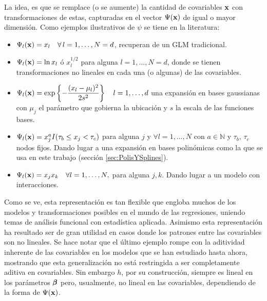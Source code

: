 \documentclass[../Main/Main.tex]{subfiles}
\begin{document}
La idea, es que se remplace (o se aumente) la cantidad de covariables $\mathbf{x}$ con transformaciones de estas, capturadas en el vector $\Psi(\mathbf{x})$ de igual o mayor dimensión. Como ejemplos ilustrativos de $\psi$ se tiene en la literatura:
\begin{itemize}[label = {}]
	\item $\Psi_l(\mathbf{x}) = x_l \quad \forall\,l = 1,\ldots, N = d$,  recuperan de un GLM tradicional.
	\item $\Psi_l(\mathbf{x}) = \ln x_l$ ó $x^{1/2}_l$ para alguna $l = 1,\ldots, N = d$, donde se tienen transformaciones no lineales en cada una (o algunas) de las covariables.
	\item $\Psi_l(\mathbf{x}) = \exp\left\{-\dfrac{(x_l - \mu_l)^2}{2s^2}\right\} \quad l = 1,\ldots,d$ una expansión en bases gaussianas con $\mu_j$ el parámetro que gobierna la ubicación y $s$ la escala de las funciones bases.
	\item $\Psi_l(\mathbf{x}) = x_j^aI( \tau_b \leq x_j <  \tau_c)$ para alguna $j$ y $\forall l =1,\ldots,N$ con $a\in \mathbb{N}$ y $\tau_b$, $\tau_c$ nodos fijos. Dando lugar a  una expansión en bases polinómicas como la que se usa en este trabajo (sección \ref{sec:PolisYSplines}).
	\item $\Psi_l(\mathbf{x}) = x_jx_k  \quad \forall l = 1,\ldots,N,$  para alguna $j,k$. Dando lugar a un modelo con interacciones. 
\end{itemize}

Como se ve, esta representación es tan flexible que engloba muchos de los modelos y transformaciones posibles en el mundo de las regresiones, uniendo temas de análisis funcional con estadística aplicada. Asimismo esta representación ha resultado ser de gran utilidad en casos donde los patrones entre las covariables son no lineales. Se hace notar que el último ejemplo rompe con la aditividad inherente de las covariables en los modelos que se han estudiado hasta ahora, mostrando que esta generalización no está restringida a ser completamente aditiva en covariables. Sin embargo $h$, por su construcción, siempre es lineal en los parámetros $\bm{\beta}$ pero, usualmente, no lineal en las covariables, dependiendo de la forma de $\Psi(\mathbf{x})$.
\end{document}
